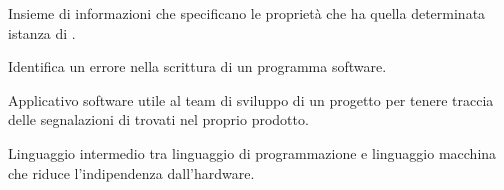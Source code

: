Insieme di informazioni che specificano le proprietà  che ha quella determinata istanza di .

Identifica un errore nella scrittura di un programma software.

Applicativo software utile al team di sviluppo di un progetto per tenere traccia delle segnalazioni di  trovati nel proprio prodotto.
 
Linguaggio intermedio tra linguaggio di programmazione e linguaggio macchina che riduce l'indipendenza dall'hardware.
\clearpage
